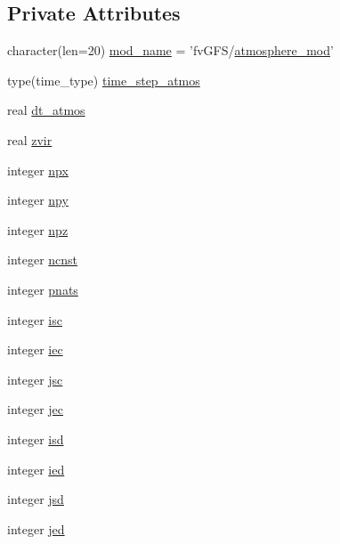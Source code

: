 \subsection*{Private Attributes}
\begin{DoxyCompactItemize}
\item 
character(len=20) \hyperlink{classatmosphere__mod_ad4f4fdf067d2b71eb5764b34cea8cb92}{mod\-\_\-name} = 'fv\-G\-F\-S/\hyperlink{classatmosphere__mod}{atmosphere\-\_\-mod}'
\item 
type(time\-\_\-type) \hyperlink{classatmosphere__mod_a6d42cfe750246363957a2e0aaa251f0b}{time\-\_\-step\-\_\-atmos}
\item 
real \hyperlink{classatmosphere__mod_a8bd26483e8952209607d542434d5a1f1}{dt\-\_\-atmos}
\item 
real \hyperlink{classatmosphere__mod_a313b4e35ea4020ee6ce916400b716e81}{zvir}
\item 
integer \hyperlink{classatmosphere__mod_aa26f13c1bf254400bc1d3c556bc4b2f7}{npx}
\item 
integer \hyperlink{classatmosphere__mod_aeef69bc0cde093c538645187edff87ff}{npy}
\item 
integer \hyperlink{classatmosphere__mod_a8db34afa5af2e9757555a6ce961b26e5}{npz}
\item 
integer \hyperlink{classatmosphere__mod_a9a8c995d33f2c1869ae7d0b49d5e1002}{ncnst}
\item 
integer \hyperlink{classatmosphere__mod_a3ae095d62282ac16560419aa858cbd5b}{pnats}
\item 
integer \hyperlink{classatmosphere__mod_a1a7a45008a0aebc7bce0bc31d6ded35c}{isc}
\item 
integer \hyperlink{classatmosphere__mod_ab0f4510c9097aa7a29c57c545aa02976}{iec}
\item 
integer \hyperlink{classatmosphere__mod_aa39dea540d1cba46aa0cd710e17bf8a9}{jsc}
\item 
integer \hyperlink{classatmosphere__mod_a0ac3bd99046244dd0abfa4719b688bc0}{jec}
\item 
integer \hyperlink{classatmosphere__mod_a26b6f2e397bc0d76f12ae674aad670be}{isd}
\item 
integer \hyperlink{classatmosphere__mod_a775666c64f59edcf96c530c1fc0f1ee9}{ied}
\item 
integer \hyperlink{classatmosphere__mod_a972cd4fc5737c35941feca9dbb6e46a8}{jsd}
\item 
integer \hyperlink{classatmosphere__mod_a0d51bfe05ec1bd062c1fbbc01c42bf3a}{jed}
\item 

\end{DoxyCompactItemize}
